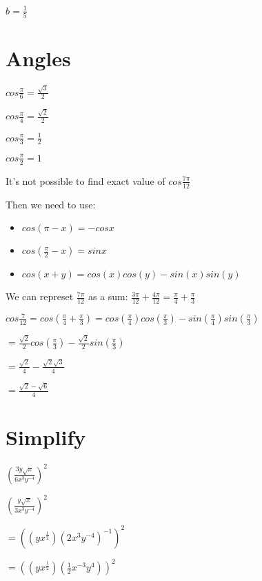 \documentclass[12pt,a4paper]{article}
\begin{document}
\noindent $\boxed{b = \frac{1}{5}}$

\newpage

\section*{Angles}


\noindent $cos \frac{\pi}{6} = \frac{\sqrt{3}}{2}$

\noindent $cos \frac{\pi}{4} = \frac{\sqrt{2}}{2}$

\noindent $cos \frac{\pi}{3} = \frac{1}{2}$

\noindent $cos \frac{\pi}{2} = 1$
\newline

\noindent It's not possible to find exact value of $cos \frac{7\pi}{12}$

\noindent Then we need to use:

\begin{itemize}
    \item $cos(\pi - x) = -cos x$
    \item $cos(\frac{\pi}{2} - x) = sin x$
    \item $cos(x + y) = cos(x)cos(y) - sin(x)sin(y)$
\end{itemize}


\noindent We can represet $\frac{7\pi}{12}$ as a sum: $\frac{3\pi}{12} + \frac{4\pi}{12} = \frac{\pi}{4} + \frac{\pi}{3}$

\noindent $cos \frac{7}{12} = cos (\frac{\pi}{4} + \frac{\pi}{3}) = cos(\frac{\pi}{4})cos(\frac{\pi}{3}) - sin(\frac{\pi}{4})sin(\frac{\pi}{3})$

\noindent $ = \frac{\sqrt{2}}{2}cos(\frac{\pi}{3}) - \frac{\sqrt{2}}{2}sin(\frac{\pi}{3})$

\noindent $ = \frac{\sqrt{2}}{4} - \frac{\sqrt{2}\sqrt{3}}{4}$

\noindent $ = \boxed{\frac{\sqrt{2} - \sqrt{6}}{4}}$


\newpage


\section*{Simplify}

$(\frac{3y\sqrt{x}}{6x^3 y^{-4}})^2$

\noindent $(\frac{y\sqrt{x}}{3x^3 y^{-4}})^2$


\noindent $= ((y x^{\frac{1}{2}})(2x^{3} y^{-4})^{-1})^2$

\noindent $= ((y x^{\frac{1}{2}})(\frac{1}{2}x^{-3} y^{4}))^2$
\end{document}
